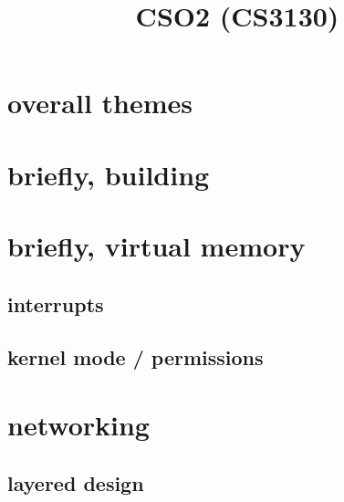 \date{}
\title{CSO2 (CS3130)}

\begin{frame}
    \titlepage
\end{frame}



\section{overall themes}


\section{briefly, building}



\section{briefly, virtual memory}






\subsection{interrupts}






\subsection{kernel mode / permissions}




\section{networking}


\subsection{layered design}

